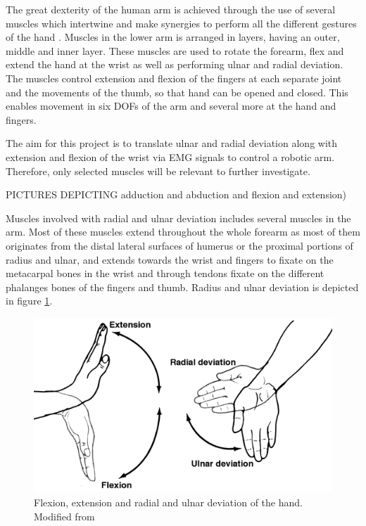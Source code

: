 The great dexterity of the human arm is achieved through the use of several muscles which intertwine and make synergies to perform all the different gestures of the hand \cite{jiang2009} \cite{avella2006}. Muscles in the lower arm is arranged in layers, having an outer, middle and inner layer. These muscles are used to rotate the forearm, flex and extend the hand at the wrist as well as performing ulnar and radial deviation. The muscles control extension and flexion of the fingers at each separate joint and the movements of the thumb, so that hand can be opened and closed. This enables movement in six DOFs of the arm and several more at the hand and fingers.

The aim for this project is to translate ulnar and radial deviation along with extension and flexion of the wrist via EMG signals to control a robotic arm. Therefore, only selected muscles will be relevant to further investigate. 


PICTURES DEPICTING adduction and abduction and flexion and extension)

Muscles involved with radial and ulnar deviation includes several muscles in the arm. Most of these muscles extend throughout the whole forearm as most of them originates from the distal lateral surfaces of humerus or the proximal portions of radius and ulnar, and extends towards the wrist and fingers to fixate on the metacarpal bones in the wrist and through tendons fixate on the different phalanges bones of the fingers and thumb. Radius and ulnar deviation is depicted in figure \ref{fig:wrist_move}.

\begin{figure}[H]                                         %
	\includegraphics[width=.4\textwidth]{figures/anatomy/wrist_move}  %
	\caption{Flexion, extension and radial and ulnar deviation of the hand. Modified from  \cite{hamilton2008}}
	\label{fig:wrist_move}  %
\end{figure}

